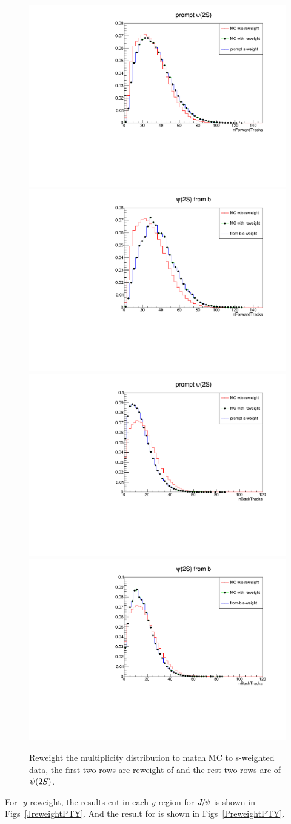 \begin{figure}[H]
\begin{center}
      \includegraphics[width=0.25\linewidth]{pdf/Psi2S/reweight/npF.pdf}
      \includegraphics[width=0.25\linewidth]{pdf/Psi2S/reweight/nbF.pdf}
      \includegraphics[width=0.25\linewidth]{pdf/Psi2S/reweight/npB.pdf}
      \includegraphics[width=0.25\linewidth]{pdf/Psi2S/reweight/nbB.pdf}
    \end{center}
    \caption{
      Reweight the multiplicity distribution to match MC to s-weighted data, the first two rows are reweight of \jpsi and the rest two rows are of ${\psi{(2S)}}$.}
    \label{reweight}
\end{figure}
For \jpsi \pt-$y$ reweight, the results cut in each $y$ region for ${{J\mskip -3mu/\mskip -2mu\psi}}$ is shown in Figs~\ref{JreweightPTY}. And the result for \psitwos is shown in Figs~\ref{PreweightPTY}.
